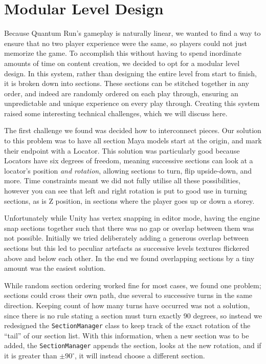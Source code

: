 \documentclass[a4paper,oneside]{memoir}
\begin{document}
		\section{Modular Level Design} 

			Because Quantum Run's gameplay is naturally linear, we wanted to find a way to ensure that no two player experience were the same, so players could not just memorize the game.
			To accomplish this without having to spend inordinate amounts of time on content creation, we decided to opt for a modular level design.
			In this system, rather than designing the entire level from start to finish, it is broken down into sections.
			These sections can be stitched together in any order, and indeed are randomly ordered on each play through, ensuring an unpredictable and unique experience on every play through.
			Creating this system raised some interesting technical challenges, which we will discuss here.

			The first challenge we found was decided how to interconnect pieces. 
			Our solution to this problem was to have all section Maya models start at the origin, and mark their endpoint with a Locator. 
			This solution was particularly good because Locators have six degrees of freedom, meaning successive sections can look at a locator's position \emph{and rotation}, allowing sections to turn, flip upside-down, and more. 
			Time constraints meant we did not fully utilise all these possibilities, however you can see that left and right rotation is put to good use in turning sections, as is Z position, in sections where the player goes up or down a storey.

			Unfortunately while Unity has vertex snapping in editor mode, having the engine snap sections together such that there was no gap or overlap between them was not possible. 
			Initially we tried deliberately adding a generous overlap between sections but this led to peculiar artefacts as successive levels textures flickered above and below each other.
			In the end we found overlapping sections by a tiny amount was the easiest solution.

			While random section ordering worked fine for most cases, we found one problem; sections could cross their own path, due several to successive turns in the same direction. Keeping count of how many turns have occurred was not a solution, since there is no rule stating a section must turn exactly 90 degrees, so instead we redesigned the \texttt{SectionManager} class to keep track of the exact rotation of the ``tail'' of our section list.
			With this information, when a new section was to be added, the \texttt{SectionManager} appends the section, looks at the new rotation, and if it is greater than $\pm90^\circ$, it will instead choose a different section.
\end{document}
